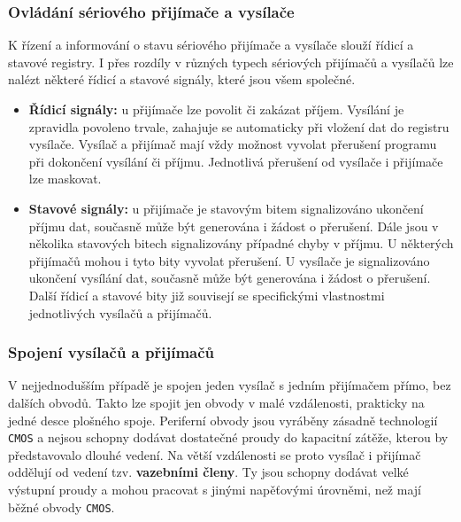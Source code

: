       \subsubsection{Ovládání sériového přijímače a vysílače}
        K řízení a informování o stavu sériového přijímače a vysílače slouží řídicí a stavové 
        registry. I přes rozdíly v různých typech sériových přijímačů a vysílačů lze nalézt některé 
        řídicí a stavové signály, které jsou všem společné.
        \begin{itemize}\addtolength{\itemsep}{-0.5\baselineskip}
          \item \textbf{Řídicí signály:} u přijímače lze povolit či zakázat příjem. Vysílání 
                je zpravidla povoleno trvale, zahajuje se automaticky při vložení dat do registru 
                vysílače. Vysílač a přijímač mají vždy možnost vyvolat přerušení programu při 
                dokončení vysílání či příjmu.  Jednotlivá přerušení od vysílače i přijímače lze 
                maskovat.
          \item \textbf{Stavové signály:} u přijímače je stavovým bitem signalizováno ukončení  
                příjmu dat, současně může být generována i žádost o přerušení. Dále jsou v několika 
                stavových bitech signalizovány případné chyby v příjmu. U některých přijímačů mohou 
                i tyto bity vyvolat přerušení. U vysílače je signalizováno ukončení vysílání dat, 
                současně může být generována i žádost o přerušení. Další řídicí a stavové bity již 
                souvisejí se specifickými vlastnostmi jednotlivých vysílačů a přijímačů.
        \end{itemize}
        
      \subsubsection{Spojení vysílačů a přijímačů}\label{MIT:chap_TxRx_con}
        V nejjednodušším případě je spojen jeden vysílač s jedním přijímačem přímo, bez dalších 
        obvodů. Takto lze spojit jen obvody v malé vzdálenosti, prakticky na jedné desce plošného 
        spoje. Periferní obvody jsou vyráběny zásadně technologií \texttt{CMOS} a nejsou schopny 
        dodávat dostatečné proudy do kapacitní zátěže, kterou by představovalo dlouhé vedení. Na 
        větší vzdálenosti se proto vysílač i přijímač oddělují od vedení tzv. \textbf{vazebními 
        členy}. Ty jsou schopny dodávat velké výstupní proudy a mohou pracovat s jinými napěťovými 
        úrovněmi, než mají běžné obvody \texttt{CMOS}.
        
